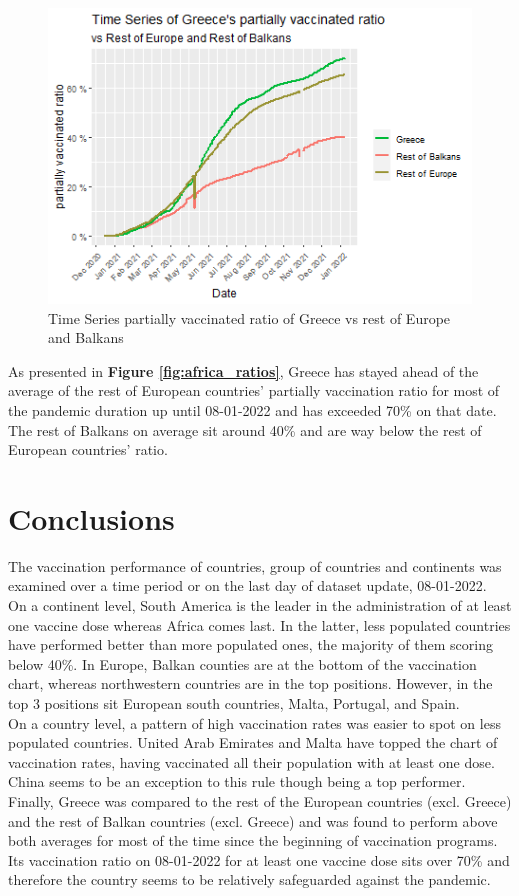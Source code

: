 \begin{figure}[h]
    \centering
    \includegraphics[width=12cm]{figures/Greece_vs_Europe_Balkans.png}
    \caption{Time Series partially vaccinated ratio of Greece vs rest of Europe and Balkans}
    \label{fig:greece_ratios}
\end{figure}
\FloatBarrier %

As presented in \textbf{Figure \ref{fig:africa_ratios}}, Greece has stayed ahead of the average of the rest of European countries' partially vaccination ratio for most of the pandemic duration up until 08-01-2022 and has exceeded 70\% on that date.
\\
The rest of Balkans on average sit around 40\% and are way below the rest of European countries' ratio.

\section{Conclusions}
The vaccination performance of countries, group of countries and continents was examined over a time period or on the last day of dataset update, 08-01-2022. \\
On a continent level, South America is the leader in the administration of at least one vaccine dose whereas Africa comes last. In the latter, less populated countries have performed better than more populated ones, the majority of them scoring below 40\%. In Europe, Balkan counties are at the bottom of the vaccination chart, whereas northwestern countries are in the top positions. However, in the top 3 positions sit European south countries, Malta, Portugal, and Spain.\\
On a country level, a pattern of high vaccination rates was easier to spot on less populated countries. United Arab Emirates and Malta have topped the chart of vaccination rates, having vaccinated all their population with at least one dose. China seems to be an exception to this rule though being a top performer.
\\
Finally, Greece was compared to the rest of the European countries (excl. Greece) and the rest of Balkan countries (excl. Greece) and was found to perform above both averages for most of the time since the beginning of vaccination programs. Its vaccination ratio on 08-01-2022  for at least one vaccine dose sits over 70\% and therefore the country seems to be relatively safeguarded against the pandemic.